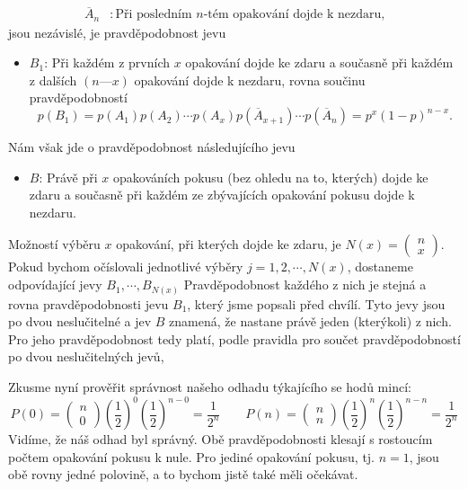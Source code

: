 \begin{example}
\begin{align*}
    \overline{A}_n     &: \text{Při posledním \(n\)-tém opakování dojde k nezdaru,}
  \end{align*}
  jsou nezávislé, je pravděpodobnost jevu
  \begin{itemize}
    \item \(B_1\): Při každém z prvních \(x\) opakování dojde ke zdaru a současně při každém z 
          dalších \((n — x)\) opakování dojde k nezdaru, rovna součinu pravděpodobností
          \begin{equation*}
            p(B_1) = p(A_1)p(A_2)\cdots p(A_x)p(\overline{A}_{x+1})\cdots p(\overline{A}_n) 
                   = p^x (1 - p)^{n-x}.
          \end{equation*}
  \end{itemize}
  Nám však jde o pravděpodobnost následujícího jevu
  \begin{itemize}
    \item \(B\): Právě při \(x\) opakováních pokusu (bez ohledu na to, kterých) dojde ke zdaru a 
          současně při každém ze zbývajících opakování pokusu dojde k nezdaru.
  \end{itemize}
  
  Možností výběru \(x\) opakování, při kterých dojde ke zdaru, je \(N(x) = \begin{pmatrix} n \\ 
  x\end{pmatrix}\). Pokud bychom očíslovali jednotlivé výběry \(j = 1, 2, \cdots, N(x)\), dostaneme 
  odpovídající jevy \(B_1, \cdots, B_{N(x)}\) Pravděpodobnost každého z nich je stejná a rovna 
  pravděpodobnosti jevu \(B_1\), který jsme popsali před chvílí. Tyto jevy jsou po dvou 
  neslučitelné a jev \(B\) znamená, že nastane právě jeden (kterýkoli) z nich. Pro jeho 
  pravděpodobnost tedy platí, podle pravidla pro součet pravděpodobností po dvou neslučitelných 
  jevů,
   
  Zkusme nyní prověřit správnost našeho odhadu týkajícího se hodů mincí:
  \begin{equation*}
    P(0) = \begin{pmatrix} n \\ 0\end{pmatrix} 
           \left(\dfrac{1}{2}\right)^0\left(\dfrac{1}{2}\right)^{n-0} 
         = \dfrac{1}{2^n}            \qquad
    P(n) = \begin{pmatrix} n \\ n\end{pmatrix} 
           \left(\dfrac{1}{2}\right)^n\left(\dfrac{1}{2}\right)^{n-n} 
         = \dfrac{1}{2^n}     
  \end{equation*}
  Vidíme, že náš odhad byl správný. Obě pravděpodobnosti klesají s rostoucím počtem opakování 
  pokusu k nule.  Pro jediné opakování pokusu, tj. \(n = 1\), jsou obě rovny jedné polovině, a to 
  bychom jistě také měli očekávat. 
  

\end{example}
